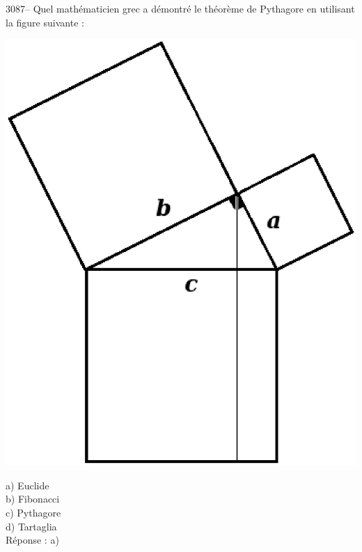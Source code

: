 \documentclass[letterpaper, 12pt]{article}
\begin{document}
3087-- Quel math\'ematicien grec a d\'emontr\'e le th\'eor\`eme de Pythagore en utilisant la figure suivante :\\
\begin{center}
\includegraphics[scale=0.3]{pyth_euclide.eps}\\
\end{center}

a) Euclide\\
b) Fibonacci\\
c) Pythagore\\
d) Tartaglia\\

R\'eponse : a)\\
\end{document}
